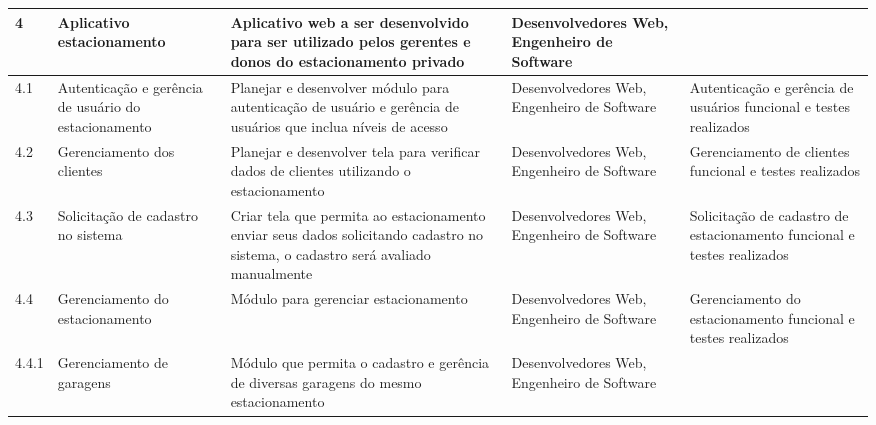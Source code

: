 \begin{longtable}{  l  p{}  p{}  p{}  p{}  }
	\midrule
	4           & Aplicativo estacionamento                                 & Aplicativo web a ser desenvolvido para ser utilizado pelos gerentes e donos do estacionamento privado                                                                            & Desenvolvedores Web, Engenheiro de Software                                                      &                                                                                                          \\*
	\midrule
	4.1         & Autenticação e gerência de usuário do estacionamento  & Planejar e desenvolver módulo para autenticação de usuário e gerência de usuários que inclua níveis de acesso                                                             & Desenvolvedores Web, Engenheiro de Software                                                      & Autenticação e gerência de usuários funcional e testes realizados                                    \\*
	\midrule
	4.2         & Gerenciamento dos clientes                                & Planejar e desenvolver tela para verificar dados de clientes utilizando o estacionamento                                                                                         & Desenvolvedores Web, Engenheiro de Software                                                      & Gerenciamento de clientes funcional e testes realizados                                                  \\*
	\midrule
	4.3         & Solicitação de cadastro no sistema                      & Criar tela que permita ao estacionamento enviar seus dados solicitando cadastro no sistema, o cadastro será avaliado manualmente                                                & Desenvolvedores Web, Engenheiro de Software                                                      & Solicitação de cadastro de estacionamento funcional e testes realizados                                \\*
	\midrule
	4.4         & Gerenciamento do estacionamento                           & Módulo para gerenciar estacionamento                                                                                                                                            & Desenvolvedores Web, Engenheiro de Software                                                      & Gerenciamento do estacionamento funcional e testes realizados                                            \\*
	\midrule
	4.4.1       & Gerenciamento de garagens                                 & Módulo que permita o cadastro e gerência de diversas garagens do mesmo estacionamento                                                                                          & Desenvolvedores Web, Engenheiro de Software                                                      &                                                                                                          \\*

\end{longtable}
